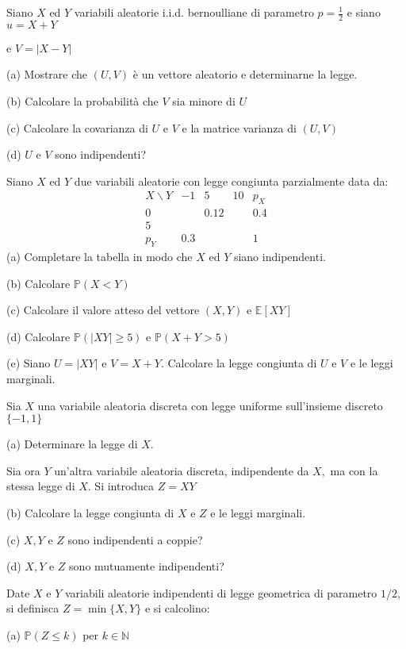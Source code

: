 Siano $X$ ed $Y$ variabili aleatorie i.i.d. bernoulliane di parametro $p=\frac{1}{2}$ e siano $u=X+Y$

e $V=|X-Y|$

(a) Mostrare che $(U,V)$ è un vettore aleatorio e determinarne la legge.

(b) Calcolare la probabilità che $V$ sia minore di $U$

(c) Calcolare la covarianza di $U$ e $V$ e la matrice varianza di $(U,V)$

(d) $U$ e $V$ sono indipendenti?

Siano $X$ ed $Y$ due variabili aleatorie con legge congiunta parzialmente data da:
\begin{equation*}
\begin{array}{ c|c|c|c|c }
X\backslash Y & -1 & 5 & 10 & p_{X}\\
\hline
0 &  & 0.12 &  & 0.4\\
\hline
5 &  &  &  & \\
\hline
p_{Y} & 0.3 &  &  & 1
\end{array}
\end{equation*}
(a) Completare la tabella in modo che $X$ ed $Y$ siano indipendenti.

(b) Calcolare $\mathbb{P} (X< Y)$

(c) Calcolare il valore atteso del vettore $(X,Y)$ e $\mathbb{E} [XY]$

(d) Calcolare $\mathbb{P} (|XY|\geq 5)$ e $\mathbb{P} (X+Y >5)$

(e) Siano $U=|XY|$ e $V=X+Y$. Calcolare la legge congiunta di $U$ e $V$ e le leggi marginali.

Sia $X$ una variabile aleatoria discreta con legge uniforme sull'insieme discreto $\{-1,1\}$

(a) Determinare la legge di $X$.

Sia ora $Y$ un'altra variabile aleatoria discreta, indipendente da $X,$ ma con la stessa legge di $X$. Si introduca $Z=XY$

(b) Calcolare la legge congiunta di $X$ e $Z$ e le leggi marginali.

(c) $X,Y$ e $Z$ sono indipendenti a coppie?

(d) $X,Y$ e $Z$ sono mutuamente indipendenti?

Date $X$ e $Y$ variabili aleatorie indipendenti di legge geometrica di parametro $1/2$, si definisca $Z=\min \{X,Y\}$ e si calcolino:

(a) $\mathbb{P} (Z\leq k)$ per $k\in \mathbb{N}$

